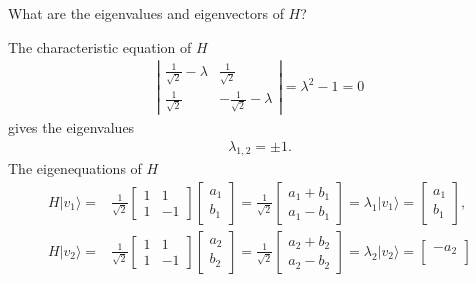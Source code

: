 \documentclass[en]{sol-man}
\begin{document}
\begin{exe}
    What are the eigenvalues and eigenvectors of $H$?
\end{exe}
\begin{sol}
    The characteristic equation of $H$
    \begin{align}
        \left\lvert\begin{matrix}
            \frac{1}{\sqrt{2}}-\lambda&\frac{1}{\sqrt{2}}\\
            \frac{1}{\sqrt{2}}&-\frac{1}{\sqrt{2}}-\lambda
        \end{matrix}\right\rvert=\lambda^2-1=0
    \end{align}
    gives the eigenvalues
    \begin{align}
        \lambda_{1,2}=\pm 1.
    \end{align}
    The eigenequations of $H$
    \begin{align}
        H\lvert v_1\rangle=&\frac{1}{\sqrt{2}}\begin{bmatrix}
            1&1\\
            1&-1
        \end{bmatrix}\begin{bmatrix}
            a_1\\
            b_1
        \end{bmatrix}=\frac{1}{\sqrt{2}}\begin{bmatrix}
            a_1+b_1\\
            a_1-b_1
        \end{bmatrix}=\lambda_1\lvert v_1\rangle=\begin{bmatrix}
            a_1\\
            b_1
        \end{bmatrix},\\
        H\lvert v_2\rangle=&\frac{1}{\sqrt{2}}\begin{bmatrix}
            1&1\\
            1&-1
        \end{bmatrix}\begin{bmatrix}
            a_2\\
            b_2
        \end{bmatrix}=\frac{1}{\sqrt{2}}\begin{bmatrix}
            a_2+b_2\\
            a_2-b_2
        \end{bmatrix}=\lambda_2\lvert v_2\rangle=\begin{bmatrix}
            -a_2\\

\end{bmatrix}
\end{align}
\end{sol}
\end{document}
